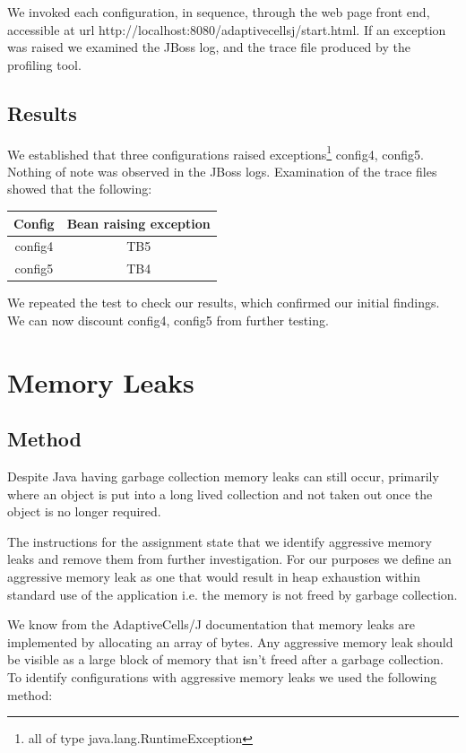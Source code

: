 We invoked each configuration, in sequence, through the web page front end, accessible at url http://localhost:8080/adaptivecellsj/start.html. If an exception was raised we examined the JBoss log, and the trace file produced by the profiling tool.

\subsection{Results}

We established that three configurations raised exceptions\footnote{all of type java.lang.RuntimeException} config4, config5. Nothing of note was observed in the JBoss logs. Examination of the trace files showed that the following:

\begin{center}
\begin{tabular}{| c | c |}
 \hline
 Config & Bean raising exception \\
 \hline
 config4 & TB5 \\
 config5 & TB4 \\
 \hline
\end{tabular}
\end{center}

We repeated the test to check our results, which confirmed our initial findings. We can now discount config4, config5 from further testing.

\section{Memory Leaks}

\subsection{Method}

Despite Java having garbage collection memory leaks can still occur, primarily where an object is put into a long lived collection and not taken out once the object is no longer required.

The instructions for the assignment state that we identify aggressive memory leaks and remove them from further investigation. For our purposes we define an aggressive memory leak as one that would result in heap exhaustion within standard use of the application i.e. the memory is not freed by garbage collection.

We know from the AdaptiveCells/J documentation that memory leaks are implemented by allocating an array of bytes. Any aggressive memory leak should be visible as a large block of memory that isn't freed after a garbage collection. To identify configurations with aggressive memory leaks we used the following method:

